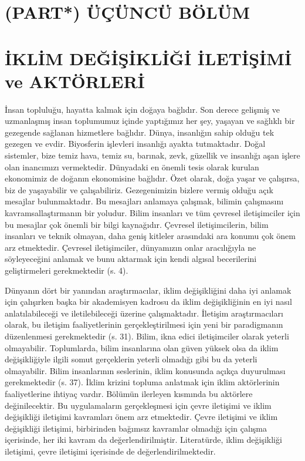 \documentclass[
]{book}
\begin{document}
\hypertarget{part-uxfcuxe7uxfcncuxfc-buxf6luxfcm}{%
\chapter*{\texorpdfstring{(PART*) \textbf{ÜÇÜNCÜ BÖLÜM}}{(PART*) ÜÇÜNCÜ BÖLÜM}}\label{part-uxfcuxe7uxfcncuxfc-buxf6luxfcm}}

\hypertarget{iklim-deux11fiux15fikliux11fi-iletiux15fimi-ve-aktuxf6rleri}{%
\chapter{İKLİM DEĞİŞİKLİĞİ İLETİŞİMİ ve AKTÖRLERİ}\label{iklim-deux11fiux15fikliux11fi-iletiux15fimi-ve-aktuxf6rleri}}

İnsan topluluğu, hayatta kalmak için doğaya bağlıdır. Son derece gelişmiş ve uzmanlaşmış insan toplumumuz içinde yaptığımız her şey, yaşayan ve sağlıklı bir gezegende sağlanan hizmetlere bağlıdır. Dünya, insanlığın sahip olduğu tek gezegen ve evdir. Biyosferin işlevleri insanlığı ayakta tutmaktadır. Doğal sistemler, bize temiz hava, temiz su, barınak, zevk, güzellik ve insanlığı aşan işlere olan inancımızı vermektedir. Dünyadaki en önemli tesis olarak kurulan ekonomimiz de doğanın ekonomisine bağlıdır. Özet olarak, doğa yaşar ve çalışırsa, biz de yaşayabilir ve çalışabiliriz. Gezegenimizin bizlere vermiş olduğu açık mesajlar bulunmaktadır. Bu mesajları anlamaya çalışmak, bilimin çalışmasını kavramsallaştırmanın bir yoludur. Bilim insanları ve tüm çevresel iletişimciler için bu mesajlar çok önemli bir bilgi kaynağıdır. Çevresel iletişimcilerin, bilim insanları ve teknik olmayan, daha geniş kitleler arasındaki ara konumu çok önem arz etmektedir. Çevresel iletişimciler, dünyamızın onlar aracılığıyla ne söyleyeceğini anlamak ve bunu aktarmak için kendi algısal becerilerini geliştirmeleri gerekmektedir (s. 4). \citep{jurin2010environmental}

Dünyanın dört bir yanından araştırmacılar, iklim değişikliğini daha iyi anlamak için çalışırken başka bir akademisyen kadrosu da iklim değişikliğinin en iyi nasıl anlatılabileceği ve iletilebileceği üzerine çalışmaktadır. İletişim araştırmacıları olarak, bu iletişim faaliyetlerinin gerçekleştirilmesi için yeni bir paradigmanın düzenlenmesi gerekmektedir (s. 31). \citep{hansen2016communicating} Bilim, ikna edici iletişimciler olarak yeterli olmayabilir. Toplumlarda, bilim insanlarına olan güven yüksek olsa da iklim değişikliğiyle ilgili somut gerçeklerin yeterli olmadığı gibi bu da yeterli olmayabilir. Bilim insanlarının seslerinin, iklim konusunda açıkça duyurulması gerekmektedir (s. 37). \citep{hansen2016communicating} İklim krizini topluma anlatmak için iklim aktörlerinin faaliyetlerine ihtiyaç vardır. Bölümün ilerleyen kısmında bu aktörlere değinilecektir. Bu uygulamaların gerçekleşmesi için çevre iletişimi ve iklim değişikliği iletişimi kavramları önem arz etmektedir. Çevre iletişimi ve iklim değişikliği iletişimi, birbirinden bağımsız kavramlar olmadığı için çalışma içerisinde, her iki kavram da değerlendirilmiştir. Literatürde, iklim değişikliği iletişimi, çevre iletişimi içerisinde de değerlendirilmektedir.
\end{document}
